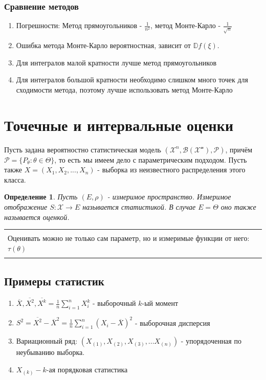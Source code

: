 \documentclass[a4paper,12pt]{article}
\newcommand{\disp}{\mathbb{D}}
\newcommand{\orst}[2]{#1_{(#2)}}
\newcommand{\sumin}{\sum\limits_{i=1}^n}
\newcommand{\sample}{X_1, X_2, ..., X_n}
\newenvironment{annotation}{\begin{center}
    \begin{tabular}{|p{0.9\textwidth}|}
    \hline\\
}
{ 
    \\\\\hline
    \end{tabular} 
    \end{center}
}
\newtheorem{dfn}{Определение}[section]
\theoremstyle{named}
\begin{document}
\subsubsection{Сравнение методов}
\begin{enumerate}
    \item Погрешности: Метод прямоугольников - $\frac{1}{n^2}$, метод Монте-Карло - $\frac{1}{\sqrt{n}}$
    \item Ошибка метода Монте-Карло вероятностная, зависит от $\disp f(\xi)$. 
    \item Для интегралов малой кратности лучше метод прямоугольников 
    \item Для интегралов большой кратности необходимо слишком много точек для сходимости метода, поэтому лучше использовать метод Монте-Карло 
\end{enumerate}

\section{Точечные и интервальные оценки}
Пусть задана вероятностно статистическая модель $(\mathcal{X}^n, \mathcal{B(X^n)}, \mathcal{P})$, причём $\mathcal{P} = \{ P_\theta
: \theta \in \Theta\}$, то есть мы имеем дело с параметрическим подходом. Пусть также $X =(\sample)$ - выборка из 
неизвестного распределения этого класса. 
\begin{dfn}
    Пусть $(E, \rho)$ - измеримое пространство. Измеримое отображение $S: \mathcal{X} \to E$ называется статистикой. В случае 
    $E = \Theta$ оно также называется оценкой.
\end{dfn}
\begin{annotation}
    Оценивать можно не только сам параметр, но и измеримые функции от него: $\tau(\theta)$
\end{annotation}
\subsection*{Примеры статистик}
\begin{enumerate}
    \item $\overline{X}, \overline{X^2}, \overline{X^k} = \frac{1}{n}\sumin X_i^k$ - выборочный $k$-ый момент
    \item $S^2 = \overline{X^2} - \overline{X}^2 = \frac{1}{n}\sumin (X_i - \overline{X})^2$ - выборочная дисперсия
    \item Вариационный ряд: $(\orst{X}{1}, \orst{X}{2}, \orst{X}{3}, ...\orst{X}{n})$ - упорядоченная по неубыванию выборка. 
    \item $\orst{X}{k} - k$-ая порядковая статистика 
\end{enumerate}
\end{document}
